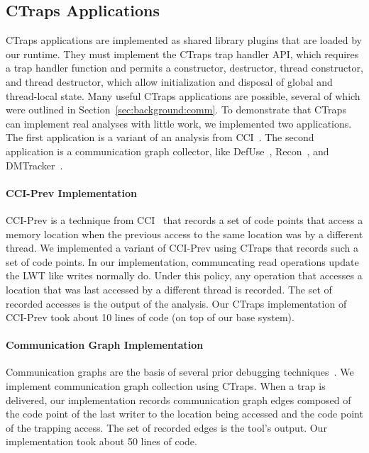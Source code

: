 \documentclass[10pt,nocopyrightspace]{sigplanconf}
\newcommand{\ctraps}{CTraps\xspace}
\begin{document}
\subsection{\ctraps Applications}
\label{sec:apps}
\ctraps applications are implemented as shared library plugins that are loaded
by our runtime.  They must implement the \ctraps trap handler API, which
requires a trap handler function and permits a constructor, destructor, thread
constructor, and thread destructor, which allow initialization and disposal of
global and thread-local state.  Many useful \ctraps applications are possible,
several of which were outlined in Section~\ref{sec:background:comm}.    To
demonstrate that \ctraps can implement real analyses with little work, we
implemented two applications. The first application is a variant of an 
analysis from CCI~\cite{cci}.  The second application is a communication graph
collector, like DefUse~\cite{defuse}, Recon~\cite{recon}, and
DMTracker~\cite{dmtracker}.

\paragraph{CCI-Prev Implementation}
CCI-Prev is a technique from CCI~\cite{cci} that records a set of code points
that access a memory location when the previous access to the same location was
by a different thread.  We implemented a variant of CCI-Prev using \ctraps that
records such a set of code points.  In our implementation, communcating read
operations update the LWT like writes normally do.  Under this policy, any
operation that accesses a location that was last accessed by a different thread
is recorded.  The set of recorded accesses is the output of the analysis.  Our
\ctraps implementation of CCI-Prev took about 10 lines of code (on top of our
base system). 

\paragraph{Communication Graph Implementation} Communication graphs are the
basis of several prior debugging techniques~\cite{recon, bugaboo, defuse}.  We
implement communication graph collection using \ctraps.  When a trap is
delivered, our implementation records communication graph edges composed of the
code point of the last writer to the location being accessed and the code point
of the trapping access.  The set of recorded edges is the tool's output.  Our
implementation took about 50 lines of code. 
\end{document}
